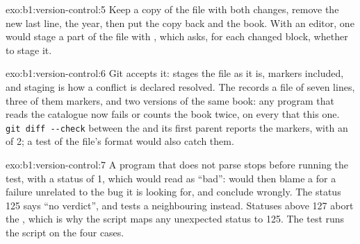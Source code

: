 \begin{solution}{exo:b1:version-control:5}
Keep a copy of the file with both changes, remove the new last line,  the year, then put the copy back and 
the book.
With an editor, one would stage a part of the file with , which asks, for each changed block, whether
to stage it.
\end{solution}

\begin{solution}{exo:b1:version-control:6}
Git accepts it:  stages the file as it is, markers included, and staging is how a conflict is declared resolved.
The  records a file of seven lines, three of them markers, and two versions of the same book: any program that
reads the catalogue now fails or counts the book twice, on every  that  this one. \texttt{git diff -{}-{}check}
between the  and its first parent reports the markers, with an  of 2; a test of the file's format would
also catch them.
\end{solution}

\begin{solution}{exo:b1:version-control:7}
A program that does not parse stops before running the test, with a status of 1, which  would read as
``bad'':  would then blame a  for a failure unrelated to the bug it is looking for, and conclude wrongly.
The status 125 says ``no verdict'', and  tests a neighbouring  instead. Statuses above 127 abort the
, which is why the script maps any unexpected status to 125. The test  runs the
script on the four cases.
\end{solution}

